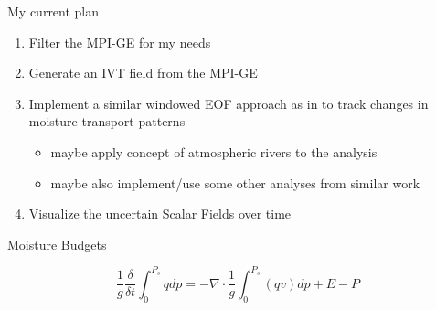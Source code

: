 \begin{frame}{My current plan}
  
  {\large
  \begin{enumerate}
    \item Filter the MPI-GE for my needs
    \item Generate an IVT field from the MPI-GE
    \item Implement a similar windowed EOF approach as in \cite{vietinghoff_visual_2021} to track changes in moisture transport patterns
      \begin{itemize}
        \item maybe apply concept of atmospheric rivers to the analysis
        \item maybe also implement/use some other analyses from similar work 
      \end{itemize}
    \item Visualize the uncertain Scalar Fields over time
  \end{enumerate}
}
\end{frame}


\begin{frame}{Moisture Budgets}


$$
\frac{1}{g} \frac{\delta}{\delta t} \int^{P_s}_0 q dp = - \nabla \cdot \frac{1}{g} \int^{P_s}_0 (qv) dp + E - P
$$
  
\end{frame}

